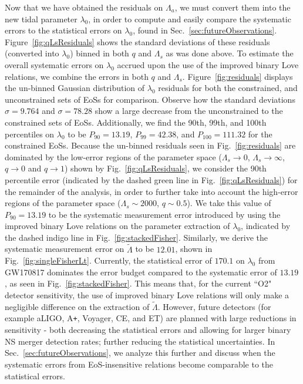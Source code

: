 \documentclass[prd,twocolumn,nofootinbib,superscriptaddress,amsmath,amssymb]{revtex4-1}
\begin{document}
Now that we have obtained the residuals on $\Lambda_a$, we must convert them into the new tidal parameter $\lambda_0$, in order to compute and easily compare the systematic errors to the statistical errors on $\lambda_0$, found in Sec.~\ref{sec:futureObservations}.
Figure~\ref{fig:qLsResiduals} shows the standard deviations of these residuals (converted into $\lambda_0$) binned in both $q$ and $\Lambda_s$ as was done above. 
To estimate the overall systematic errors on $\lambda_0$ accrued upon the use of the improved binary Love relations, we combine the errors in both $q$ and $\Lambda_s$.
Figure~\ref{fig:residuals} displays the un-binned Gaussian distribution of $\lambda_0$ residuals for both the constrained, and unconstrained sets of EoSs for comparison.
Observe how the standard deviations $\sigma=9.764$ and $\sigma=78.28$ show a large decrease from the unconstrained to the constrained sets of EoSs.
Additionally, we find the 90th, 99th, and 100th percentiles on $\lambda_0$ to be $P_{90}=13.19$, $P_{99}=42.38$, and $P_{100}=111.32$ for the constrained EoSs.
Because the un-binned residuals seen in Fig.~\ref{fig:residuals} are dominated by the low-error regions of the parameter space ($\Lambda_s \rightarrow 0$, $\Lambda_s \rightarrow \infty$, $q \rightarrow 0$ and $q \rightarrow 1$) shown by Fig.~\ref{fig:qLsResiduals}, we consider the 90th percentile error (indicated by the dashed green line in Fig.~\ref{fig:qLsResiduals}) for the remainder of the analysis, in order to further take into account the high-error regions of the parameter space ($\Lambda_s \sim 2000$, $q\sim0.5$).
We take this value of $P_{90}=13.19$ to be the systematic measurement error introduced by using the improved binary Love relations on the parameter extraction of $\lambda_0$, indicated by the dashed indigo line in Fig.~\ref{fig:stackedFisher}.
Similarly, we derive the systematic measurement error on $\tilde\Lambda$ to be $12.01$, shown in Fig.~\ref{fig:singleFisherLt}.
Currently, the statistical error of $170.1$ on $\lambda_0$ from GW170817 dominates the error budget compared to the systematic error of $13.19$, as seen in Fig.~\ref{fig:stackedFisher}.
This means that, for the current ``O2" detector sensitivity, the use of improved binary Love relations will only make a negligible difference on the extraction of $\tilde\Lambda$.
However, future detectors (for example aLIGO, A\texttt{+}, Voyager, CE, and ET) are planned with large reductions in sensitivity - both decreasing the statistical errors and allowing for larger binary NS merger detection rates; further reducing the statistical uncertainties.
In Sec.~\ref{sec:futureObservations}, we analyze this further and discuss when the systematic errors from EoS-insensitive relations become comparable to the statistical errors.
\end{document}
